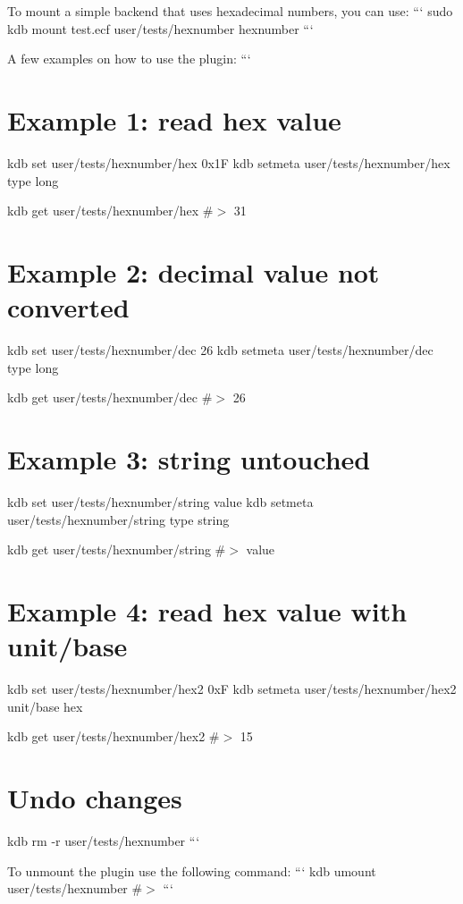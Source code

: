 \begin{DoxyItemize}
\item To mount a simple backend that uses hexadecimal numbers, you can use\+: ``` sudo kdb mount test.\+ecf user/tests/hexnumber hexnumber ```
\item A few examples on how to use the plugin\+: ``` \section*{Example 1\+: read hex value}
\end{DoxyItemize}

kdb set user/tests/hexnumber/hex 0x1F kdb setmeta user/tests/hexnumber/hex type long

kdb get user/tests/hexnumber/hex \#$>$ 31

\section*{Example 2\+: decimal value not converted}

kdb set user/tests/hexnumber/dec 26 kdb setmeta user/tests/hexnumber/dec type long

kdb get user/tests/hexnumber/dec \#$>$ 26

\section*{Example 3\+: string untouched}

kdb set user/tests/hexnumber/string value kdb setmeta user/tests/hexnumber/string type string

kdb get user/tests/hexnumber/string \#$>$ value

\section*{Example 4\+: read hex value with unit/base}

kdb set user/tests/hexnumber/hex2 0xF kdb setmeta user/tests/hexnumber/hex2 unit/base hex

kdb get user/tests/hexnumber/hex2 \#$>$ 15

\section*{Undo changes}

kdb rm -\/r user/tests/hexnumber ```


\begin{DoxyItemize}
\item To unmount the plugin use the following command\+: ``` kdb umount user/tests/hexnumber \#$>$ ``` 
\end{DoxyItemize}